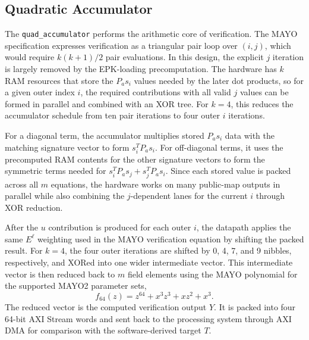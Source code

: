 \documentclass[conference]{IEEEtran}
\begin{document}
\subsection{Quadratic Accumulator}
The \texttt{quad\_accumulator} performs the arithmetic core of verification. The MAYO specification expresses verification as a triangular pair loop over \((i,j)\), which would require \(k(k+1)/2\) pair evaluations. In this design, the explicit \(j\) iteration is largely removed by the EPK-loading precomputation. The hardware has \(k\) RAM resources that store the \(P_a s_i\) values needed by the later dot products, so for a given outer index \(i\), the required contributions with all valid \(j\) values can be formed in parallel and combined with an XOR tree. For \(k=4\), this reduces the accumulator schedule from ten pair iterations to four outer \(i\) iterations.

For a diagonal term, the accumulator multiplies stored \(P_a s_i\) data with the matching signature vector to form \(s_i^T P_a s_i\). For off-diagonal terms, it uses the precomputed RAM contents for the other signature vectors to form the symmetric terms needed for \(s_i^T P_a s_j+s_j^T P_a s_i\). Since each stored value is packed across all \(m\) equations, the hardware works on many public-map outputs in parallel while also combining the \(j\)-dependent lanes for the current \(i\) through XOR reduction.

After the \(u\) contribution is produced for each outer \(i\), the datapath applies the same \(E^\ell\) weighting used in the MAYO verification equation by shifting the packed result. For \(k=4\), the four outer iterations are shifted by 0, 4, 7, and 9 nibbles, respectively, and XORed into one wider intermediate vector. This intermediate vector is then reduced back to \(m\) field elements using the MAYO polynomial for the supported MAYO2 parameter sets,
\begin{equation}
f_{64}(z)=z^{64}+x^3z^3+xz^2+x^3.
\end{equation}
The reduced vector is the computed verification output \(Y\). It is packed into four 64-bit AXI Stream words and sent back to the processing system through AXI DMA for comparison with the software-derived target \(T\).
\end{document}
